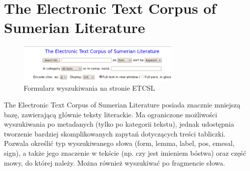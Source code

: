 
\section{The Electronic Text Corpus of Sumerian Literature \cite{etcsl}} 
\begin{figure}[h]
 \centering
 \includegraphics[width=300px]{../diagramy/etcsl-search.png}
 \caption{Formularz wyszukiwania na stronie ETCSL}
 \label{fig:etcsl-search}
\end{figure}

The Electronic Text Corpus of Sumerian Literature posiada znacznie mniejszą bazę, zawierającą głównie teksty literackie. 
Ma ograniczone możliwości wyszukiwania po metadanych (tylko po kategorii tekstu), jednak udostępnia tworzenie bardziej 
skomplikowanych zapytań dotyczących treści tabliczki. 
Pozwala określić typ wyszukiwanego słowa (form, lemma, label, pos, emesal, sign),
 a także jego znaczenie w tekście (np. czy jest imieniem bóstwa) oraz część mowy, do której należy. 
Można również wyszukiwać po fragmencie słowa.
